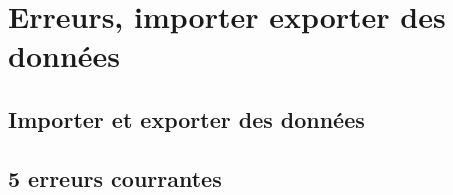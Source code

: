 \section{Erreurs, importer exporter des données}
\subsection{Importer et exporter des données}

\subsection{5 erreurs courrantes}

